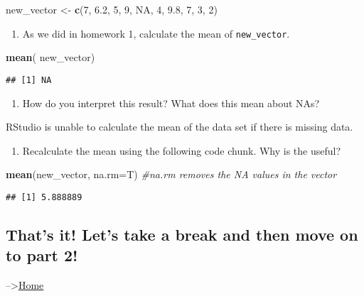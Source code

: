 \documentclass[
]{article}
\newenvironment{Shaded}{\begin{snugshade}}{\end{snugshade}}
\newcommand{\AttributeTok}[1]{\textcolor[rgb]{0.13,0.29,0.53}{#1}}
\newcommand{\CommentTok}[1]{\textcolor[rgb]{0.56,0.35,0.01}{\textit{#1}}}
\newcommand{\ConstantTok}[1]{\textcolor[rgb]{0.56,0.35,0.01}{#1}}
\newcommand{\DecValTok}[1]{\textcolor[rgb]{0.00,0.00,0.81}{#1}}
\newcommand{\FloatTok}[1]{\textcolor[rgb]{0.00,0.00,0.81}{#1}}
\newcommand{\FunctionTok}[1]{\textcolor[rgb]{0.13,0.29,0.53}{\textbf{#1}}}
\newcommand{\NormalTok}[1]{#1}
\newcommand{\OtherTok}[1]{\textcolor[rgb]{0.56,0.35,0.01}{#1}}
\providecommand{\tightlist}{%
  \setlength{\itemsep}{0pt}\setlength{\parskip}{0pt}}
\begin{document}
\begin{Shaded}
\begin{Highlighting}[]
\NormalTok{new\_vector }\OtherTok{\textless{}{-}} \FunctionTok{c}\NormalTok{(}\DecValTok{7}\NormalTok{, }\FloatTok{6.2}\NormalTok{, }\DecValTok{5}\NormalTok{, }\DecValTok{9}\NormalTok{, }\ConstantTok{NA}\NormalTok{, }\DecValTok{4}\NormalTok{, }\FloatTok{9.8}\NormalTok{, }\DecValTok{7}\NormalTok{, }\DecValTok{3}\NormalTok{, }\DecValTok{2}\NormalTok{)}
\end{Highlighting}
\end{Shaded}

\begin{enumerate}
\def\labelenumi{\arabic{enumi}.}
\setcounter{enumi}{1}
\tightlist
\item
  As we did in homework 1, calculate the mean of \texttt{new\_vector}.
\end{enumerate}

\begin{Shaded}
\begin{Highlighting}[]
\FunctionTok{mean}\NormalTok{( new\_vector)}
\end{Highlighting}
\end{Shaded}

\begin{verbatim}
## [1] NA
\end{verbatim}

\begin{enumerate}
\def\labelenumi{\arabic{enumi}.}
\setcounter{enumi}{2}
\tightlist
\item
  How do you interpret this result? What does this mean about NAs?
\end{enumerate}

RStudio is unable to calculate the mean of the data set if there is
missing data.

\begin{enumerate}
\def\labelenumi{\arabic{enumi}.}
\setcounter{enumi}{3}
\tightlist
\item
  Recalculate the mean using the following code chunk. Why is the
  useful?
\end{enumerate}

\begin{Shaded}
\begin{Highlighting}[]
\FunctionTok{mean}\NormalTok{(new\_vector, }\AttributeTok{na.rm=}\NormalTok{T) }\CommentTok{\#na.rm removes the NA values in the vector}
\end{Highlighting}
\end{Shaded}

\begin{verbatim}
## [1] 5.888889
\end{verbatim}

\hypertarget{thats-it-lets-take-a-break-and-then-move-on-to-part-2}{%
\subsection{That's it! Let's take a break and then move on to part
2!}\label{thats-it-lets-take-a-break-and-then-move-on-to-part-2}}

--\textgreater{}\href{https://jmledford3115.github.io/datascibiol/}{Home}
\end{document}
